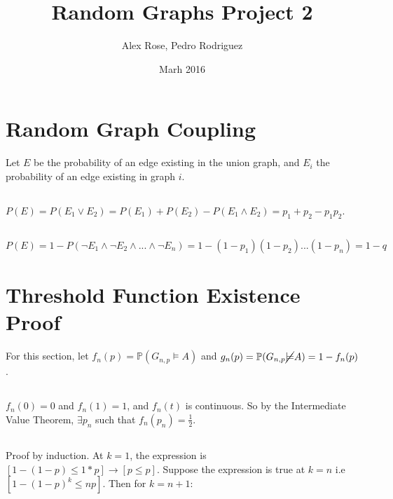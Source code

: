 \documentclass{article}
\title{Random Graphs Project 2}
\author{Alex Rose, Pedro Rodriguez}
\date{Marh 2016}
\begin{document}
\maketitle

\section{Random Graph Coupling}

Let $E$ be the probability of an edge existing in the union graph, and $E_i$ the probability of an edge existing in graph $i$.

\subsection{}
$P(E) = P(E_1 \lor E_2) = P(E_1) + P(E_2) - P(E_1 \land E_2) = p_1 + p_2 -p_1p_2$.

\subsection{}
$P(E) = 1 - P(\neg E_1 \land \neg E_2 \land ... \land \neg E_n) = 1 - (1-p_1)(1-p_2)...(1-p_n) = 1 - q$ 


\section{Threshold Function Existence Proof}

For this section, let $f_n(p) = \mathbb{P}(G_{n,p} \models A)$ and $g_n(p) = \mathbb{P}(G_{n,p} \cancel{\models} A) = 1 - f_n(p)$.

\subsection{}

\subsection{}
$f_n(0) = 0$ and $f_n(1) = 1$, and $f_n(t)$ is continuous. So by the Intermediate Value Theorem, $\exists p_n$ such that $f_n(p_n) = \frac{1}{2}$.

\subsection{}
Proof by induction. At $k = 1$, the expression is $[1-(1-p) \le 1*p] \rightarrow [p \le p]$. Suppose the expression is true at $k = n$ i.e $[1-(1-p)^k \le np]$. Then for $k = n+1$:
\end{document}
